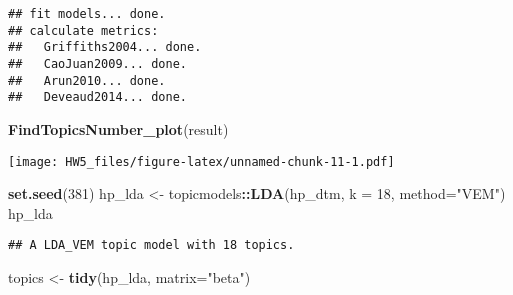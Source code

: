 \documentclass[
]{article}
\newenvironment{Shaded}{\begin{snugshade}}{\end{snugshade}}
\newcommand{\CommentTok}[1]{\textcolor[rgb]{0.56,0.35,0.01}{\textit{#1}}}
\newcommand{\DataTypeTok}[1]{\textcolor[rgb]{0.13,0.29,0.53}{#1}}
\newcommand{\DecValTok}[1]{\textcolor[rgb]{0.00,0.00,0.81}{#1}}
\newcommand{\KeywordTok}[1]{\textcolor[rgb]{0.13,0.29,0.53}{\textbf{#1}}}
\newcommand{\NormalTok}[1]{#1}
\newcommand{\OperatorTok}[1]{\textcolor[rgb]{0.81,0.36,0.00}{\textbf{#1}}}
\newcommand{\StringTok}[1]{\textcolor[rgb]{0.31,0.60,0.02}{#1}}
\begin{document}
\begin{verbatim}
## fit models... done.
## calculate metrics:
##   Griffiths2004... done.
##   CaoJuan2009... done.
##   Arun2010... done.
##   Deveaud2014... done.
\end{verbatim}

\begin{Shaded}
\begin{Highlighting}[]
\KeywordTok{FindTopicsNumber_plot}\NormalTok{(result)}
\end{Highlighting}
\end{Shaded}

\texttt{[image: HW5\_files/figure-latex/unnamed-chunk-11-1.pdf]}

\begin{Shaded}
\begin{Highlighting}[]
\KeywordTok{set.seed}\NormalTok{(}\DecValTok{381}\NormalTok{)}
\NormalTok{hp_lda <-}\StringTok{ }\NormalTok{topicmodels}\OperatorTok{::}\KeywordTok{LDA}\NormalTok{(hp_dtm, }\DataTypeTok{k =} \DecValTok{18}\NormalTok{, }\DataTypeTok{method=}\StringTok{"VEM"}\NormalTok{)}
\NormalTok{hp_lda}
\end{Highlighting}
\end{Shaded}

\begin{verbatim}
## A LDA_VEM topic model with 18 topics.
\end{verbatim}

\begin{Shaded}
\begin{Highlighting}[]
\NormalTok{topics <-}\StringTok{ }\KeywordTok{tidy}\NormalTok{(hp_lda, }\DataTypeTok{matrix=}\StringTok{"beta"}\NormalTok{)}
\end{Highlighting}
\end{Shaded}

\begin{Shaded}
\end{Shaded}
\end{document}
